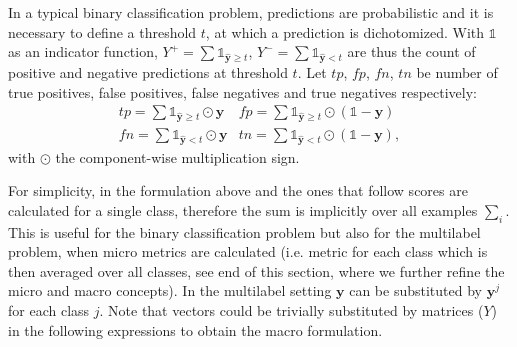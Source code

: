 In a typical binary classification problem, predictions are probabilistic and it is necessary to define a threshold \(t\), at which a prediction is dichotomized. With \(\mathds{1}\) as an indicator function, \(Y^+ = \sum \mathds{1}_{\hat{\mathbf{y}} \geq t}\), \(Y^- = \sum \mathds{1}_{\hat{\mathbf{y}} < t}\) are thus the count of positive and negative predictions at threshold \(t\). Let \(tp\), \(fp\), \(fn\), \(tn\) be number of true positives, false positives, false negatives and true negatives respectively:
%
\begin{equation}
\label{eq:conf}
\begin{array}{ll}\mathit{tp} = \sum \mathds{1}_{\hat{\mathbf{y}} \geq t} \odot \mathbf{y}  & \mathit{fp} = \sum \mathds{1}_{\hat{\mathbf{y}} \geq t} \odot (\mathds{1} - \mathbf{y}) \\[.5em] \mathit{fn} = \sum \mathds{1}_{\hat{\mathbf{y}} < t} \odot \mathbf{y} & \mathit{tn} = \sum \mathds{1}_{\hat{\mathbf{y}} < t} \odot (\mathds{1} - \mathbf{y}),
\end{array}
\end{equation}
%
with \(\odot\) the component-wise multiplication sign.


For simplicity, in the formulation above and the ones that follow scores are calculated for a single class, therefore the sum is implicitly over all examples \(\sum_i\). This is useful for the binary classification problem but also for the multilabel problem, when micro metrics are calculated (i.e. metric for each class which is then averaged over all classes, see end of this section, where we further refine the micro and macro concepts). In the multilabel setting $\mathbf{y}$ can be substituted by $\mathbf{y}^j$ for each class $j$. Note that vectors could be trivially substituted by matrices ($Y$) in the following expressions to obtain the macro formulation.




